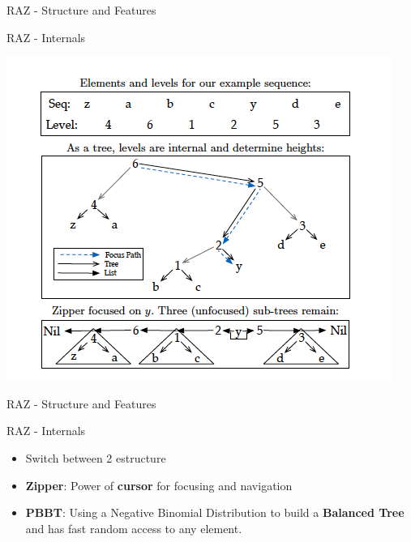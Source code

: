 \documentclass{beamer}
\begin{document}
\begin{frame}[fragile]{RAZ - Structure and Features}
  \begin{block}{RAZ - Internals}
   \begin{minipage}[t]{\linewidth}
     \begin{center}
      \includegraphics[scale=0.5]{raz_1}
     \end{center}
   \end{minipage}
 \end{block}
\end{frame}

\begin{frame}[fragile]{RAZ - Structure and Features}

  \begin{block}{RAZ - Internals}
    \begin{itemize}
      \item Switch between 2 estructure
      \item \textbf{Zipper}: Power of \textbf{cursor} for focusing and navigation
      \item \textbf{PBBT}: Using a Negative Binomial Distribution to build a \textbf{Balanced Tree} and has fast random access to any element.
    \end{itemize}
  \end{block}

\end{frame}
\end{document}
